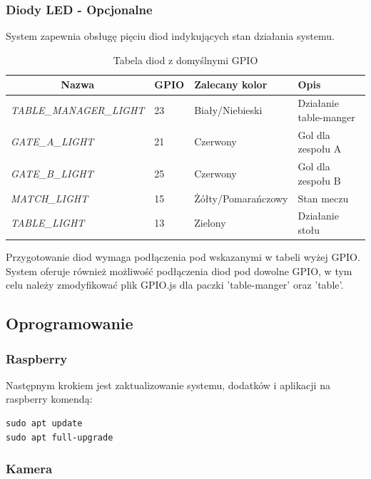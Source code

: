 \subsubsection{Diody LED - Opcjonalne}
System zapewnia obsługę pięciu diod indykujących stan działania systemu.

\begin{table}[h!]
\centering
\begin{tabular}{|l|l|l|l|}
\hline
\multicolumn{1}{|c|}{\textbf{Nazwa}} & \multicolumn{1}{c|}{\textbf{GPIO}} & \textbf{Zalecany kolor} & \textbf{Opis} \\ \hline
\textit{TABLE\_MANAGER\_LIGHT} & 23 & Biały/Niebieski & Działanie table-manger \\ \hline
\textit{GATE\_A\_LIGHT} & 21 & Czerwony & Gol dla zespołu A \\ \hline
\textit{GATE\_B\_LIGHT} & 25 & Czerwony & Gol dla zespołu B \\ \hline
\textit{MATCH\_LIGHT} & 15 & Żółty/Pomarańczowy & Stan meczu \\ \hline
\textit{TABLE\_LIGHT} & 13 & Zielony & Działanie stołu \\ \hline
\end{tabular}
\caption{Tabela diod z domyślnymi GPIO}
\end{table}

Przygotowanie diod wymaga podłączenia pod wskazanymi w tabeli wyżej GPIO. System oferuje również możliwość podłączenia diod pod dowolne GPIO,  w tym celu należy zmodyfikować plik GPIO.js dla paczki 'table-manger' oraz 'table'.

\subsection{Oprogramowanie}

\subsubsection{Raspberry}

Następnym krokiem jest zaktualizowanie systemu, dodatków i aplikacji na raspberry komendą:

\begin{lstlisting}
sudo apt update
sudo apt full-upgrade
\end{lstlisting}

\subsubsection{Kamera}

